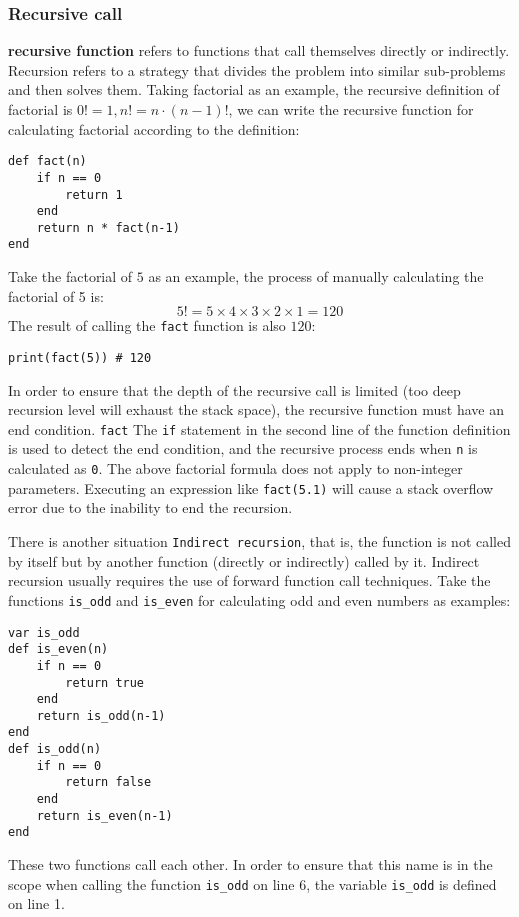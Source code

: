\subsubsection {Recursive call}

\textbf{recursive function} refers to functions that call themselves directly or indirectly. Recursion refers to a strategy that divides the problem into similar sub-problems and then solves them. Taking factorial as an example, the recursive definition of factorial is $0!=1, n!=n\cdot(n-1)!$, we can write the recursive function for calculating factorial according to the definition:
\begin{lstlisting}[language=berry]
def fact(n)
    if n == 0
        return 1
    end
    return n * fact(n-1)
end
\end{lstlisting}
Take the factorial of $5$ as an example, the process of manually calculating the factorial of 5 is:
\begin{equation*}
5! = 5 \times 4 \times 3 \times 2 \times 1 = 120
\end{equation*}
The result of calling the \texttt{fact} function is also $120$:
\begin{lstlisting}[language=berry, numbers=none]
print(fact(5)) # 120
\end{lstlisting}

In order to ensure that the depth of the recursive call is limited (too deep recursion level will exhaust the stack space), the recursive function must have an end condition. \texttt{fact} The \texttt{if} statement in the second line of the function definition is used to detect the end condition, and the recursive process ends when \texttt{n} is calculated as \texttt{0}. The above factorial formula does not apply to non-integer parameters. Executing an expression like \texttt{fact(5.1)} will cause a stack overflow error due to the inability to end the recursion.

There is another situation \texttt{Indirect recursion}, that is, the function is not called by itself but by another function (directly or indirectly) called by it. Indirect recursion usually requires the use of forward function call techniques. Take the functions \texttt{is\_odd} and \texttt{is\_even} for calculating odd and even numbers as examples:
\begin{lstlisting}[language=berry]
var is_odd
def is_even(n)
    if n == 0
        return true
    end
    return is_odd(n-1)
end
def is_odd(n)
    if n == 0
        return false
    end
    return is_even(n-1)
end
\end{lstlisting}
These two functions call each other. In order to ensure that this name is in the scope when calling the function \texttt{is\_odd} on line 6, the variable \texttt{is\_odd} is defined on line 1.

